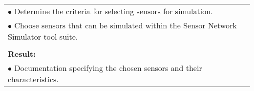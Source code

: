 \begin{table}[!h]
\begin{center}
\begin{tabular}{|p{35mm}||p{55mm}|p{50mm}||p{40mm}|}
      \multicolumn{4}{|p{150mm}|}{$\bullet$ Determine the criteria for selecting sensors for simulation.} \\
      \multicolumn{4}{|p{150mm}|}{$\bullet$ Choose sensors that can be simulated within the Sensor Network Simulator tool suite.} \\
      \multicolumn{4}{|p{150mm}|}{}                                                                                                                                                                           \\
      \multicolumn{4}{|p{150mm}|}{\textbf{Result:}}                                                                                                                                                       \\
      \multicolumn{4}{|p{150mm}|}{$\bullet$ Documentation specifying the chosen sensors and their characteristics.}                                                                                                                          \\
      \hline
    \end{tabular}
  \end{center}
\end{table}

\clearpage

